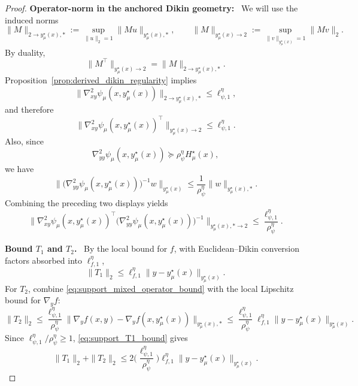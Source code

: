 \documentclass{article}
\newcommand{\proofstep}[1]{\par\smallskip\noindent\textbf{#1}\ }
\begin{document}
\begin{proof}
\proofstep{Operator-norm in the anchored Dikin geometry:}
We will use the induced norms
\[
\|M\|_{2\to y_\mu^\star(x),*}
:=
\sup_{\|u\|_2=1}\|Mu\|_{y_\mu^\star(x),*},
\qquad
\|M\|_{y_\mu^\star(x)\to 2}
:=
\sup_{\|v\|_{y_\mu^\star(x)}=1}\|Mv\|_2.
\]
By duality,
\[
\|M^\top\|_{y_\mu^\star(x)\to 2}
=
\|M\|_{2\to y_\mu^\star(x),*}.
\]
Proposition~\ref{prop:derived_dikin_regularity} implies
\begin{equation}
\label{eq:support_cross_operator_bound}
\|\nabla^2_{xy}\psi_\mu(x,y_\mu^\star(x))\|_{2\to y_\mu^\star(x),*}
\le
\ell_{\psi,1}^\eta,
\end{equation}
and therefore
\[
\|\nabla^2_{xy}\psi_\mu(x,y_\mu^\star(x))^\top\|_{y_\mu^\star(x)\to 2}
\le
\ell_{\psi,1}^\eta .
\]
Also, since
\[
\nabla^2_{yy}\psi_\mu(x,y_\mu^\star(x))
\succeq
\rho_\psi^\eta H_\mu^\star(x),
\]
we have
\begin{equation}
\label{eq:support_hinv_operator_bound}
\big\|
\big(\nabla^2_{yy}\psi_\mu(x,y_\mu^\star(x))\big)^{-1}w
\big\|_{y_\mu^\star(x)}
\le
\frac{1}{\rho_\psi^\eta}\|w\|_{y_\mu^\star(x),*}.
\end{equation}
Combining the preceding two displays yields
\begin{equation}
\label{eq:support_mixed_operator_bound}
\Big\|
\nabla^2_{xy}\psi_\mu(x,y_\mu^\star(x))^\top
\big(\nabla^2_{yy}\psi_\mu(x,y_\mu^\star(x))\big)^{-1}
\Big\|_{y_\mu^\star(x),*\to 2}
\le
\frac{\ell_{\psi,1}^\eta}{\rho_\psi^\eta}.
\end{equation}

\proofstep{Bound \(T_1\) and \(T_2\).}
By the local bound for \(f\), with Euclidean--Dikin conversion factors absorbed into
\(\ell_{f,1}^\eta\),
\begin{equation}
\label{eq:support_T1_bound}
\|T_1\|_2
\le
\ell_{f,1}^\eta\|y-y_\mu^\star(x)\|_{y_\mu^\star(x)}.
\end{equation}
For \(T_2\), combine \eqref{eq:support_mixed_operator_bound} with the local Lipschitz bound for
\(\nabla_y f\):
\[
\|T_2\|_2
\le
\frac{\ell_{\psi,1}^\eta}{\rho_\psi^\eta}
\|\nabla_y f(x,y)-\nabla_y f(x,y_\mu^\star(x))\|_{y_\mu^\star(x),*}
\le
\frac{\ell_{\psi,1}^\eta}{\rho_\psi^\eta}
\ell_{f,1}^\eta
\|y-y_\mu^\star(x)\|_{y_\mu^\star(x)} .
\]
Since \(\ell_{\psi,1}^\eta/\rho_\psi^\eta\ge1\), \eqref{eq:support_T1_bound} gives
\begin{equation}
\label{eq:support_f_terms_bound}
\|T_1\|_2+\|T_2\|_2
\le
2\Big(\frac{\ell_{\psi,1}^\eta}{\rho_\psi^\eta}\Big)
\ell_{f,1}^\eta
\|y-y_\mu^\star(x)\|_{y_\mu^\star(x)} .
\end{equation}


\end{proof}
\end{document}
